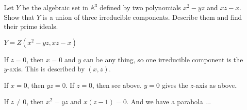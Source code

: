 \begin{exercise}
    Let \(Y\) be the algebraic set in \(\mathbb{A}^3\) defined by two polynomials \(x^2 - yz\) and \(xz - x\). Show that \(Y\) is a union of three irreducible components. Describe them and find their prime ideals.
    \end{exercise}
    \begin{solution}
        \(Y = Z(x^2 - yz, xz - x)\)
    
        If \(z = 0\), then \(x = 0\) and \(y\) can be any thing, so one irreducible component is the \(y\)-axis. This is described by \((x, z)\).
    
        If \(x = 0\), then \(yz = 0\). If \(z = 0\), then see above. \(y = 0\) gives the \(z\)-axis as above.
    
        If \(z \neq 0\), then \(x^2 = yz\) and \(x(z - 1) = 0\). And we have a parabola ...
    \end{solution}
    